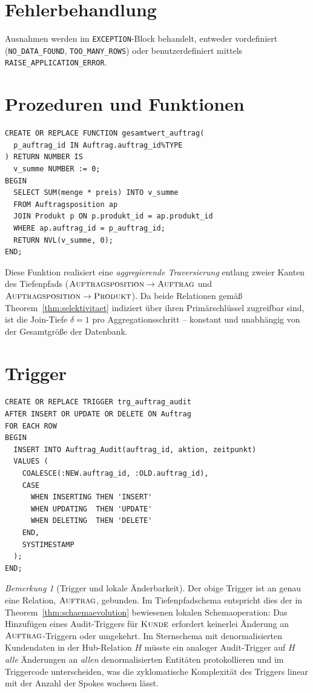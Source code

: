 ﻿\documentclass[a4paper,12pt]{report}
\theoremstyle{definition}
\theoremstyle{remark}
\newtheorem{remark}{Bemerkung}[chapter]
\begin{document}
\section{Fehlerbehandlung}

Ausnahmen werden im \texttt{EXCEPTION}-Block behandelt, entweder
vordefiniert (\texttt{NO\_DATA\_FOUND}, \texttt{TOO\_MANY\_ROWS}) oder
benutzerdefiniert mittels \texttt{RAISE\_APPLICATION\_ERROR}.

\section{Prozeduren und Funktionen}

\begin{lstlisting}
CREATE OR REPLACE FUNCTION gesamtwert_auftrag(
  p_auftrag_id IN Auftrag.auftrag_id%TYPE
) RETURN NUMBER IS
  v_summe NUMBER := 0;
BEGIN
  SELECT SUM(menge * preis) INTO v_summe
  FROM Auftragsposition ap
  JOIN Produkt p ON p.produkt_id = ap.produkt_id
  WHERE ap.auftrag_id = p_auftrag_id;
  RETURN NVL(v_summe, 0);
END;
\end{lstlisting}

Diese Funktion realisiert eine \emph{aggregierende Traversierung}
entlang zweier Kanten des Tiefenpfads
($\textsc{Auftragsposition}\to\textsc{Auftrag}$ und
$\textsc{Auftragsposition}\to\textsc{Produkt}$). Da beide Relationen
gemäß Theorem~\ref{thm:selektivitaet} indiziert über ihren
Primärschlüssel zugreifbar sind, ist die Join-Tiefe $\delta=1$ pro
Aggregationsschritt -- konstant und unabhängig von der Gesamtgröße der
Datenbank.

\section{Trigger}

\begin{lstlisting}
CREATE OR REPLACE TRIGGER trg_auftrag_audit
AFTER INSERT OR UPDATE OR DELETE ON Auftrag
FOR EACH ROW
BEGIN
  INSERT INTO Auftrag_Audit(auftrag_id, aktion, zeitpunkt)
  VALUES (
    COALESCE(:NEW.auftrag_id, :OLD.auftrag_id),
    CASE
      WHEN INSERTING THEN 'INSERT'
      WHEN UPDATING  THEN 'UPDATE'
      WHEN DELETING  THEN 'DELETE'
    END,
    SYSTIMESTAMP
  );
END;
\end{lstlisting}

\begin{remark}[Trigger und lokale Änderbarkeit]
Der obige Trigger ist an genau eine Relation, $\textsc{Auftrag}$,
gebunden. Im Tiefenpfadschema entspricht dies der in
Theorem~\ref{thm:schaemaevolution} bewiesenen lokalen
Schemaoperation: Das Hinzufügen eines Audit-Triggers für
$\textsc{Kunde}$ erfordert keinerlei Änderung an
$\textsc{Auftrag}$-Triggern oder umgekehrt. Im Sternschema mit
denormalisierten Kundendaten in der Hub-Relation $H$ müsste ein
analoger Audit-Trigger auf $H$ \emph{alle} Änderungen an \emph{allen}
denormalisierten Entitäten protokollieren und im Triggercode
unterscheiden, was die zyklomatische Komplexität des Triggers linear
mit der Anzahl der Spokes wachsen lässt.
\end{remark}
\end{document}
